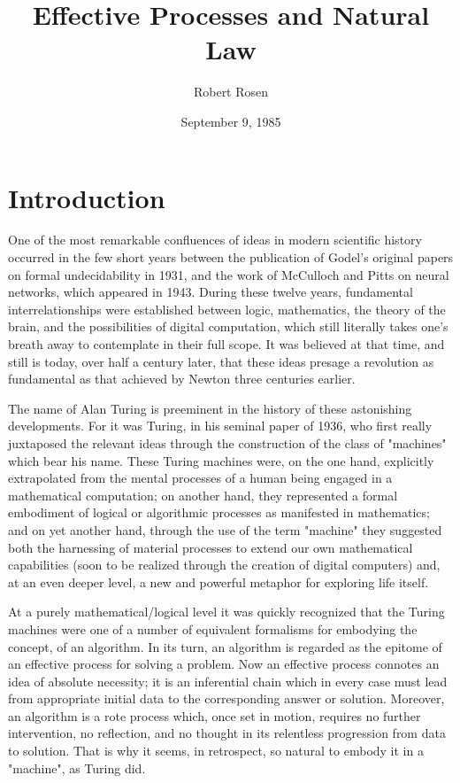 \documentclass[a4paper,12pt]{article}
\title{Effective Processes and Natural Law}
\date{September 9, 1985}
\author{Robert Rosen}
\begin{document}
\maketitle

\setcounter{tocdepth}{2}
\tableofcontents

\section{Introduction}

One of the most remarkable confluences of ideas in modern scientific history occurred in the few short years between the publication of Godel's
original papers on formal undecidability in 1931, and the work of McCulloch and Pitts on neural networks, which appeared in 1943.
During these twelve years, fundamental interrelationships were established between logic, mathematics, the theory of the brain,
and the possibilities of digital computation, which still literally takes one's breath away to contemplate in their full scope.
It was believed at that time, and still is today, over half a century later, that these ideas presage a revolution as fundamental
as that achieved by Newton three centuries earlier.

The name of Alan Turing is preeminent in the history of these astonishing developments. For it was Turing, in his seminal paper of 1936,
who first really juxtaposed the relevant ideas through the construction of the class of "machines" which bear his name.
These Turing machines were, on the one hand, explicitly extrapolated from the mental processes of a human being engaged in a mathematical computation;
on another hand, they represented a formal embodiment of logical or algorithmic processes as manifested in mathematics;
and on yet another hand, through the use of the term "machine" they suggested both the harnessing of material processes to extend
our own mathematical capabilities (soon to be realized through the creation of digital computers) and, at an even deeper level, a new and powerful
metaphor for exploring life itself.

At a purely mathematical/logical level it was quickly recognized that the Turing machines were one of a number of equivalent formalisms for
embodying the concept, of an algorithm. In its turn, an algorithm is regarded as the epitome of an effective process for solving a problem.
Now an effective process connotes an idea of absolute necessity; it is an inferential chain which in every case must lead from appropriate initial data to the
corresponding answer or solution. Moreover, an algorithm is a rote process which, once set in motion, requires no further intervention, no reflection,
and no thought in its relentless progression from data to solution. That is why it seems, in retrospect, so natural to embody it in a "machine", as Turing did.
\end{document}
